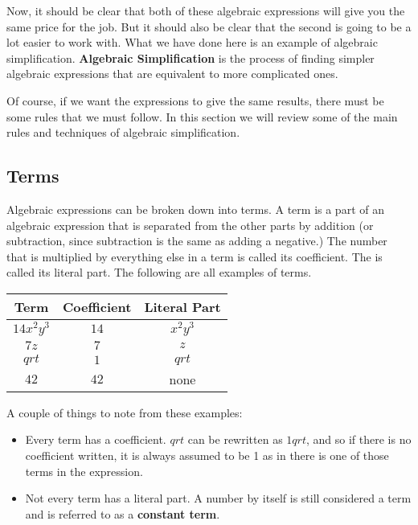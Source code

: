 Now, it should be clear that both of these algebraic expressions will give you the same price for the job. But it should also be clear that the second is going to be a lot easier to work with. What we have done here is an example of algebraic simplification. \textbf{Algebraic Simplification} is the process of finding simpler algebraic expressions that are equivalent to more complicated ones.

Of course, if we want the expressions to give the same results, there must be some rules that we must follow. In this section we will review some of the main rules and techniques of algebraic simplification.

%
%

\subsection{Terms}

Algebraic expressions can be broken down into terms. A term is a part of an algebraic expression that is separated from the other parts by addition (or subtraction, since subtraction is the same as adding a negative.) The number that is multiplied by everything else in a term is called its
coefficient. The  is called its literal part.  The following are all examples of terms.

\begin{center}
	\bgroup
	\def\arraystretch{1.5} %
	\begin{tabular}{c|c|c}
		Term & Coefficient & Literal Part \\
		\hline
		$14x^2y^3$ & $14$ & $x^2y^3$ \\
		$7z$ & $7$ & $z$ \\
		$qrt$ & $1$ & $qrt$\\
		$42$ & $42$ & none 
	\end{tabular}
	\egroup
\end{center}

A couple of things to note from these examples:

\begin{itemize}
	\item Every term has a coefficient. $qrt$ can be rewritten as $1qrt$, and so if there is no coefficient written, it is always assumed to be 1 as in there is one of those terms in the expression.
	\item Not every term has a literal part. A number by itself is still considered a term and is referred to as a \textbf{constant term}.
\end{itemize}

